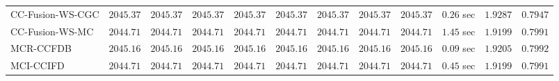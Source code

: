 \begin{table}[H]
\begin{tabular}{lrrrrrrrrrrr}
    CC-Fusion-WS-CGC & $      2045.37$ & $      2045.37$ & $      2045.37$ & $      2045.37$ & $      2045.37$ & $      2045.37$ & $      2045.37$ & $      2045.37$ & $         0.26$ sec    & $       1.9287$  & $       0.7947$ \\ 
     CC-Fusion-WS-MC & $      2044.71$ & $      2044.71$ & $      2044.71$ & $      2044.71$ & $      2044.71$ & $      2044.71$ & $      2044.71$ & $      2044.71$ & $         1.45$ sec    & $       1.9199$  & $       0.7991$ \\ 
\cmidrule{1-1} 
           MCR-CCFDB & $      2045.16$ & $      2045.16$ & $      2045.16$ & $      2045.16$ & $      2045.16$ & $      2045.16$ & $      2045.16$ & $      2045.16$ & $         0.09$ sec    & $       1.9205$  & $       0.7992$ \\ 
\cmidrule{1-1} 
           MCI-CCIFD & $      2044.71$ & $      2044.71$ & $      2044.71$ & $      2044.71$ & $      2044.71$ & $      2044.71$ & $      2044.71$ & $      2044.71$ & $         0.45$ sec    & $       1.9199$  & $       0.7991$ \\ 
\bottomrule
\end{tabular}
\end{table}

